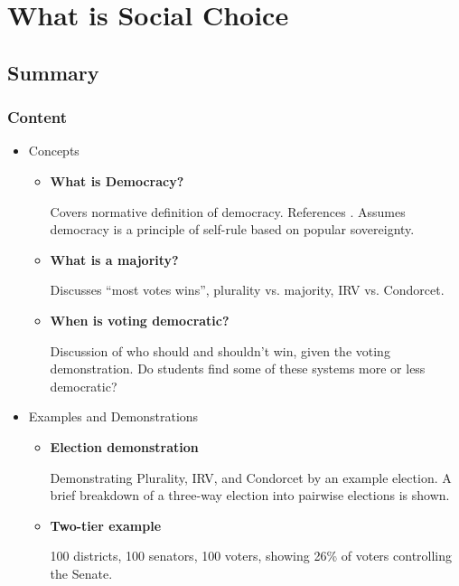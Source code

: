 \chapter{What is Social Choice}

\section{Summary}

\subsection{Content}

\begin{itemize}
    \item Concepts
    \begin{itemize}
        \item \textbf{What is Democracy?}

        Covers normative definition of democracy.  References \autocite{Kassner2006}.  Assumes democracy is a principle of self-rule based on popular sovereignty.

        \item \textbf{What is a majority?}

        Discusses ``most votes wins'', plurality vs. majority, IRV vs. Condorcet.

        \item \textbf{When is voting democratic?}

        Discussion of who should and shouldn't win, given the voting demonstration.  Do students find some of these systems more or less democratic?
    \end{itemize}

    \item Examples and Demonstrations
    \begin{itemize}
        \item \textbf{Election demonstration}

        Demonstrating Plurality, IRV, and Condorcet by an example election.  A brief breakdown of a three-way election into pairwise elections is shown.

        \item \textbf{Two-tier example}

        100 districts, 100 senators, 100 voters, showing 26\% of voters controlling the Senate.
    \end{itemize}
\end{itemize}

